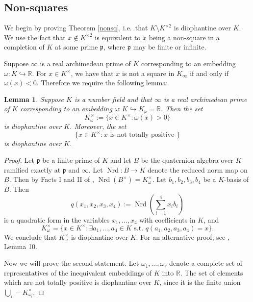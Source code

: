 \documentclass[12pt,reqno]{amsart}
\newcommand{\RR}{\mathbb{R}}
\newcommand{\pp}{\mathfrak{p}}
\DeclareMathOperator{\Nrd}{Nrd}
\newtheorem{lem}[thm]{Lemma}
\theoremstyle{definition}
\begin{document}
\subsection{Non-squares}\label{section:nonsq}
We begin by proving Theorem \ref{nonsq}, i.e.\ that $K\setminus
K^{\times2}$ is diophantine over $K$. We use the fact that $x\not\in
K^{\times2}$ is equivalent to $x$ being a non-square in a completion
of $K$ at some prime $\pp$, where $\pp$ may be finite or
infinite. 

Suppose $\infty$ is a real archimedean prime of $K$ corresponding to an embedding $\omega:K\hookrightarrow \RR$. For $x\in K^{\times}$, we have that $x$ is not a square in $K_{\infty}$ if and only if $\omega(x)<0$. Therefore we require the following lemma:

\begin{lem}\label{positivedioph}
Suppose $K$ is a number field and that $\infty$ is a real archimedean prime of $K$ corresponding to an embedding $\omega: K \hookrightarrow K_{\pp}=\RR$. Then the set 
\[
K_{\omega}^{\times}:=\{x\in K^{\times}: \omega(x)>0\}
\]
is diophantine over $K$. Moreover, the set 
\[
\{x\in K^{\times}: x \text{ is not totally positive } \}
\]
is diophantine over $K$. 
\end{lem}

\begin{proof}
Let $\pp$ be a finite prime of $K$ and let $B$ be the quaternion
algebra over $K$ ramified exactly at $\pp$ and $\infty$. Let $\Nrd: B\to K$ denote the reduced norm map on $B$. Then by Facts I and II of \cite{HS36}, $\Nrd(B^{\times})=K_{\omega}^{\times}$. Let $b_1,b_2,b_3,b_4$ be a $K$-basis of $B$. Then 
\[
q(x_1,x_2,x_3,x_4):=\Nrd\left(\sum_{i=1}^4 x_ib_i\right)
\]
is a quadratic form in the variables $x_1,\ldots,x_4$ with coefficients in $K$, and 
\[
K_{\omega}^{\times} = \{x\in K^{\times}: \exists a_1,\ldots,a_4 \in K\text{ s.t. } q(a_1,a_2,a_3,a_4)=x\}.
\]
We conclude that $K_{\omega}^{\times}$ is diophantine over $K$. For an
alternative proof, see \cite{Den80}, Lemma 10. 

 Now we will prove the second statement. Let $\omega_1,\ldots,\omega_r$ denote a complete set of representatives of the inequivalent embeddings of $K$ into $\RR$. The set of elements which are not totally positive is diophantine over $K$, since it is the finite union
$\bigcup_{i} -K_{\omega_i}^{\times}.$

\end{proof}
\end{document}
